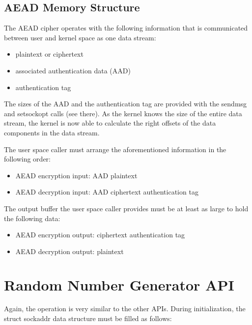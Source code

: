 \documentclass[a4paper,8pt,english]{sphinxmanual}
\begin{document}
\subsection{AEAD Memory Structure}
\label{crypto/userspace-if:aead-memory-structure}
The AEAD cipher operates with the following information that is
communicated between user and kernel space as one data stream:
\begin{itemize}
\item {} 
plaintext or ciphertext

\item {} 
associated authentication data (AAD)

\item {} 
authentication tag

\end{itemize}

The sizes of the AAD and the authentication tag are provided with the
sendmsg and setsockopt calls (see there). As the kernel knows the size
of the entire data stream, the kernel is now able to calculate the right
offsets of the data components in the data stream.

The user space caller must arrange the aforementioned information in the
following order:
\begin{itemize}
\item {} 
AEAD encryption input: AAD \textbar{}\textbar{} plaintext

\item {} 
AEAD decryption input: AAD \textbar{}\textbar{} ciphertext \textbar{}\textbar{} authentication tag

\end{itemize}

The output buffer the user space caller provides must be at least as
large to hold the following data:
\begin{itemize}
\item {} 
AEAD encryption output: ciphertext \textbar{}\textbar{} authentication tag

\item {} 
AEAD decryption output: plaintext

\end{itemize}


\section{Random Number Generator API}
\label{crypto/userspace-if:random-number-generator-api}
Again, the operation is very similar to the other APIs. During
initialization, the struct sockaddr data structure must be filled as
follows:
\end{document}
